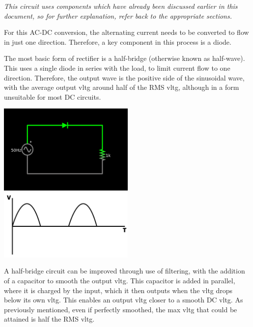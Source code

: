 \documentclass[a4paper,11pt]{report}
\begin{document}
\textit{This circuit uses components which have already been discussed earlier in this document, so for further explanation, refer back to the appropriate sections.}

For this AC-DC conversion, the alternating current needs to be converted to flow in just one direction. Therefore, a key component in this process is a diode.

The most basic form of rectifier is a half-bridge (otherwise known as half-wave). This uses a single diode in series with the load, to limit current flow to one direction. Therefore, the output wave is the positive side of the sinusoidal wave, with the average output \gls{vltg} around half of the RMS \gls{vltg}, although in a form unsuitable for most DC circuits.

\vspace*{1\baselineskip}

\includegraphics[width=0.5\textwidth]{halfbridge}
\includegraphics[width=0.5\textwidth]{halfbridgewave}

\vspace*{1\baselineskip}

A half-bridge circuit can be improved through use of filtering, with the addition of a capacitor to smooth the output \gls{vltg}. This capacitor is added in parallel, where it is charged by the input, which it then outputs when the \gls{vltg} drops below its own \gls{vltg}. This enables an output \gls{vltg} closer to a smooth DC \gls{vltg}. As previously mentioned, even if perfectly smoothed, the max \gls{vltg} that could be attained is half the RMS \gls{vltg}.

\vspace*{1\baselineskip}
\end{document}
